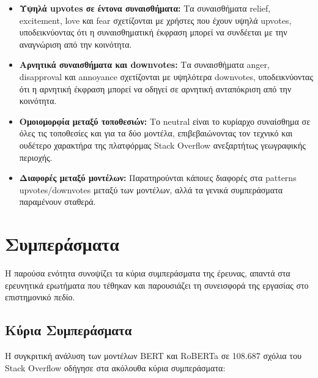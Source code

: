 \documentclass[a4paper,11pt,oneside,openany]{ioniothesis}
\begin{document}
\begin{itemize}
    \item \textbf{Υψηλά upvotes σε έντονα συναισθήματα:} Τα συναισθήματα relief, excitement, love και fear σχετίζονται με χρήστες που έχουν υψηλά upvotes, υποδεικνύοντας ότι η συναισθηματική έκφραση μπορεί να συνδέεται με την αναγνώριση από την κοινότητα.
    
    \item \textbf{Αρνητικά συναισθήματα και downvotes:} Τα συναισθήματα anger, disapproval και annoyance σχετίζονται με υψηλότερα downvotes, υποδεικνύοντας ότι η αρνητική έκφραση μπορεί να οδηγεί σε αρνητική ανταπόκριση από την κοινότητα.
    
    \item \textbf{Ομοιομορφία μεταξύ τοποθεσιών:} Το neutral είναι το κυρίαρχο συναίσθημα σε όλες τις τοποθεσίες και για τα δύο μοντέλα, επιβεβαιώνοντας τον τεχνικό και ουδέτερο χαρακτήρα της πλατφόρμας Stack Overflow ανεξαρτήτως γεωγραφικής περιοχής.
    
    \item \textbf{Διαφορές μεταξύ μοντέλων:} Παρατηρούνται κάποιες διαφορές στα patterns upvotes/downvotes μεταξύ των μοντέλων, αλλά τα γενικά συμπεράσματα παραμένουν σταθερά.
\end{itemize}





\newpage

\section{Συμπεράσματα}
\label{sec:Συμπεράσματα}

Η παρούσα ενότητα συνοψίζει τα κύρια συμπεράσματα της έρευνας, απαντά στα ερευνητικά ερωτήματα που τέθηκαν και παρουσιάζει τη συνεισφορά της εργασίας στο επιστημονικό πεδίο.

\subsection{Κύρια Συμπεράσματα}
\label{sec:Κύρια Συμπεράσματα}

Η συγκριτική ανάλυση των μοντέλων BERT και RoBERTa σε 108.687 σχόλια του Stack Overflow οδήγησε στα ακόλουθα κύρια συμπεράσματα:
\end{document}
